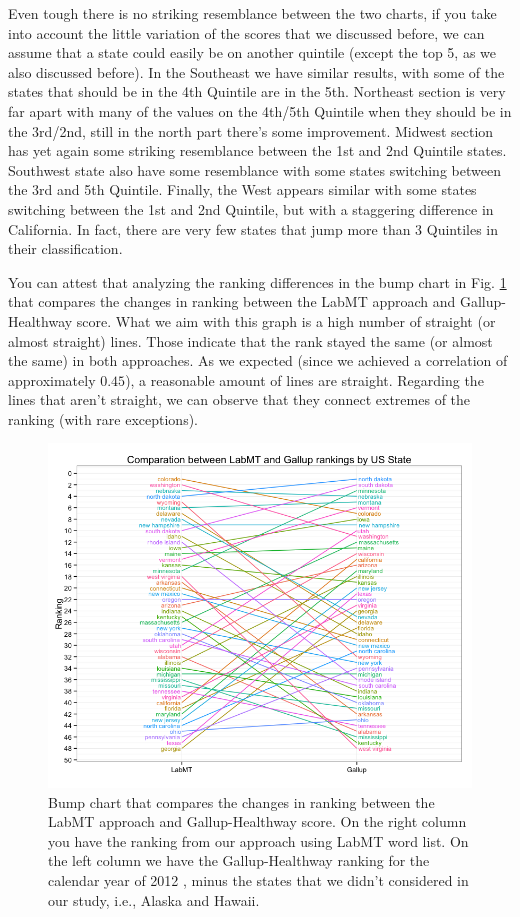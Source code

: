 \documentclass{llncs}
\begin{document}
Even tough there is no striking resemblance between the two charts, if you take into account the little variation of the scores that we discussed before, we can assume that a state could easily be on another quintile (except the top 5, as we also discussed before). In the Southeast we have similar results, with some of the states that should be in the 4th Quintile are in the 5th. Northeast section is very far apart with many of the values on the 4th/5th Quintile when they should be in the 3rd/2nd, still in the north part there's some improvement. Midwest section has yet again some striking resemblance between the 1st and 2nd Quintile states. Southwest state also have some resemblance with some states switching between the 3rd and 5th Quintile. Finally, the West appears similar with some states switching between the 1st and 2nd Quintile, but with a staggering difference in California. In fact, there are very few states that jump more than 3 Quintiles in their classification.

You can attest that analyzing the ranking differences in the bump chart in Fig. \ref{fig:bump_chart} that compares the changes in ranking between the LabMT approach and Gallup-Healthway score. What we aim with this graph is a high number of straight (or almost straight) lines. Those indicate that the rank stayed the same (or almost the same) in both approaches. As we expected (since we achieved a correlation of approximately $0.45$), a reasonable amount of lines are straight. Regarding the lines that aren't straight, we can observe that they connect extremes of the ranking (with rare exceptions).

\begin{figure}[!ht]
\centering
\includegraphics[width=\textwidth]{images/bump_chart}
\caption{Bump chart that compares the changes in ranking between the LabMT approach and Gallup-Healthway score. On the right column you have the ranking from our approach using LabMT word list. On the left column we have the Gallup-Healthway ranking for the calendar year of 2012 \cite{GallupHealthway2013}, minus the states that we didn't considered in our study, i.e., Alaska and Hawaii.}
\label{fig:bump_chart}
\end{figure}
\end{document}
